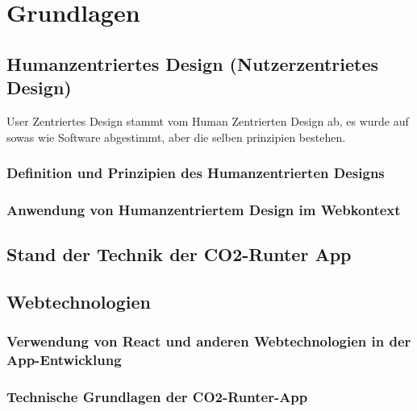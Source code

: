 
\chapter{Grundlagen}
\label{chapter:2}

\section{Humanzentriertes Design (Nutzerzentrietes Design)}

User Zentriertes Design stammt vom Human Zentrierten Design ab, es wurde auf sowas wie Software abgestimmt, aber die selben prinzipien bestehen.


\subsection{Definition und Prinzipien des Humanzentrierten Designs}

\subsection{Anwendung von Humanzentriertem Design im Webkontext}

\section{Stand der Technik der CO2-Runter App}

\section{Webtechnologien}

\subsection{Verwendung von React und anderen Webtechnologien in der App-Entwicklung}

\subsection{Technische Grundlagen der CO2-Runter-App}
